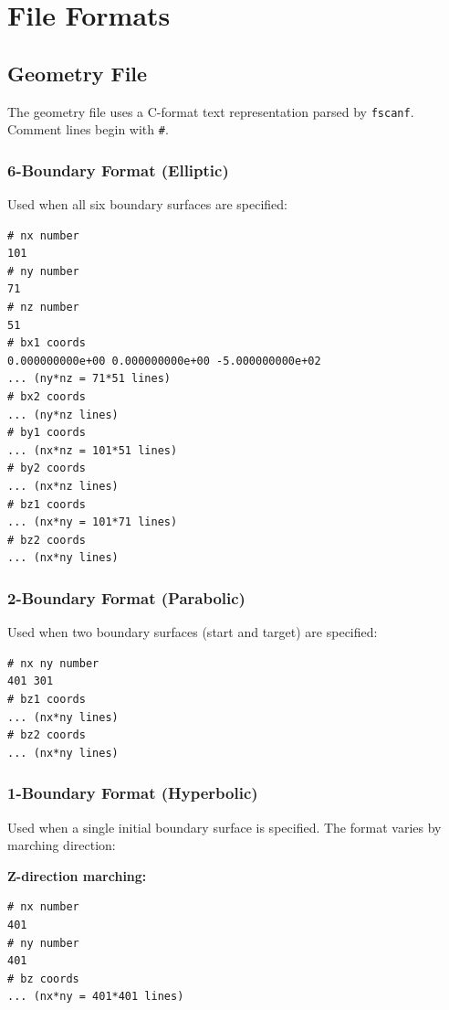 \documentclass[11pt,a4paper]{report}
\begin{document}
\chapter{File Formats}

\section{Geometry File}

The geometry file uses a C-format text representation parsed by \texttt{fscanf}. Comment lines begin with \texttt{\#}.

\subsection{6-Boundary Format (Elliptic)}

Used when all six boundary surfaces are specified:

\begin{lstlisting}[language={}]
# nx number
101
# ny number
71
# nz number
51
# bx1 coords
0.000000000e+00 0.000000000e+00 -5.000000000e+02
... (ny*nz = 71*51 lines)
# bx2 coords
... (ny*nz lines)
# by1 coords
... (nx*nz = 101*51 lines)
# by2 coords
... (nx*nz lines)
# bz1 coords
... (nx*ny = 101*71 lines)
# bz2 coords
... (nx*ny lines)
\end{lstlisting}

\subsection{2-Boundary Format (Parabolic)}

Used when two boundary surfaces (start and target) are specified:

\begin{lstlisting}[language={}]
# nx ny number
401 301
# bz1 coords
... (nx*ny lines)
# bz2 coords
... (nx*ny lines)
\end{lstlisting}

\subsection{1-Boundary Format (Hyperbolic)}

Used when a single initial boundary surface is specified. The format varies by marching direction:

\textbf{Z-direction marching:}
\begin{lstlisting}[language={}]
# nx number
401
# ny number
401
# bz coords
... (nx*ny = 401*401 lines)
\end{lstlisting}
\end{document}
